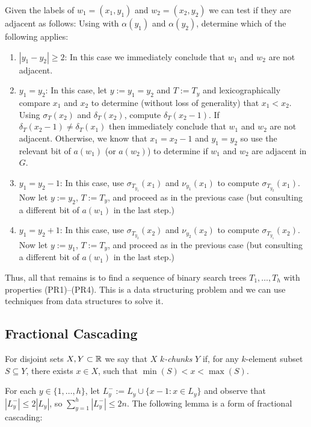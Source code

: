 \documentclass[kpfonts]{patmorin}
\begin{document}
Given the labels of $w_1=(x_1,y_1)$ and $w_2=(x_2,y_2)$ we can test if they are adjacent as follows: Using  with $\alpha(y_1)$ and $\alpha(y_2)$, determine which of the following applies:
\begin{enumerate}
  \item $|y_1-y_2|\ge 2$: In this case we immediately conclude that $w_1$ and $w_2$ are not adjacent.  
  
  \item $y_1=y_2$: In this case, let $y:=y_1=y_2$ and $T:=T_y$ and lexicographically compare $x_1$ and $x_2$ to determine (without loss of generality) that $x_1<x_2$.  Using $\sigma_{T}(x_2)$ and $\delta_{T}(x_2)$, compute $\delta_{T}(x_2-1)$.  If $\delta_{T}(x_2-1)\neq \delta_T(x_1)$ then immediately conclude that $w_1$ and $w_2$ are not adjacent.  Otherwise, we know that $x_1=x_2-1$ and $y_1=y_2$ so use the relevant bit of $a(w_1)$ (or $a(w_2)$) to determine if $w_1$ and $w_2$ are adjacent in $G$.
  
  \item $y_1=y_2-1$: In this case, use $\sigma_{T_{y_1}}(x_1)$ and $\nu_{y_1}(x_1)$ to compute $\sigma_{T_{y_2}}(x_1)$.  Now let $y:=y_2$, $T:=T_{y}$, and proceed as in the previous case (but consulting a different bit of $a(w_1)$ in the last step.)
  
  \item $y_1=y_2+1$: In this case, use $\sigma_{T_{y_2}}(x_2)$ and $\nu_{y_2}(x_2)$ to compute $\sigma_{T_{y_1}}(x_2)$.  Now let $y:=y_1$, $T:=T_{y}$, and proceed as in the previous case (but consulting a different bit of $a(w_1)$ in the last step.)
\end{enumerate}

Thus, all that remains is to find a sequence of binary search trees $T_1,\ldots,T_h$ with properties (PR1)--(PR4). This is a data structuring problem and we can use techniques from data structures to solve it.

\subsection{Fractional Cascading}

For disjoint sets $X,Y\subset \mathbb{R}$ we say that $X$ \emph{$k$-chunks} $Y$ if, for any $k$-element subset $S\subseteq Y$, there exists $x\in X$, such that $\min(S)< x<\max(S)$. 

For each $y\in\{1,\ldots,h\}$, let $L^-_y:=L_y\cup \{x-1:x\in L_y\}$ and observe that $|L^-_y|\le 2|L_y|$, so $\sum_{y=1}^h|L^-_y| \le 2n$.  The following lemma is a form of fractional cascading:
\end{document}
